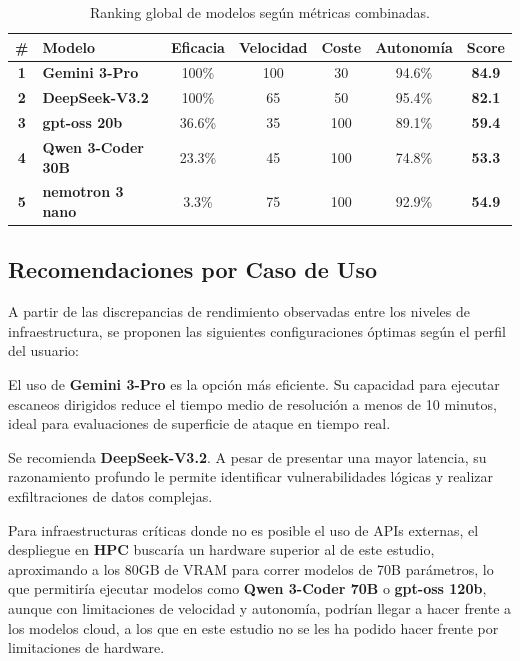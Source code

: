 \begin{table}[H]
\centering
\renewcommand{\arraystretch}{1.3}
\small
\begin{tabular}{|c|l|c|c|c|c|c|}
\hline
\rowcolor[gray]{0.85}
\textbf{\#} & \textbf{Modelo} & \textbf{Eficacia} & \textbf{Velocidad} & \textbf{Coste} & \textbf{Autonomía} & \textbf{Score} \\
\hline
\textbf{1} & \textbf{Gemini 3-Pro} & 100\% & 100 & 30 & 94.6\% & \textbf{84.9} \\
\hline
\textbf{2} & \textbf{DeepSeek-V3.2} & 100\% & 65 & 50 & 95.4\% & \textbf{82.1} \\
\hline
\textbf{3} & \textbf{gpt-oss 20b} & 36.6\% & 35 & 100 & 89.1\% & \textbf{59.4} \\
\hline
\textbf{4} & \textbf{Qwen 3-Coder 30B} & 23.3\% & 45 & 100 & 74.8\% & \textbf{53.3} \\
\hline
\textbf{5} & \textbf{nemotron 3 nano} & 3.3\% & 75 & 100 & 92.9\% & \textbf{54.9} \\
\hline
\end{tabular}
\caption{Ranking global de modelos según métricas combinadas.}
\label{tab:ranking_global}
\end{table}



\subsection{Recomendaciones por Caso de Uso}

A partir de las discrepancias de rendimiento observadas entre los niveles de infraestructura, se proponen las siguientes configuraciones óptimas según el perfil del usuario:

\begin{description}[style=nextline, leftmargin=1.5cm, font=\bfseries]
    \item[Auditorías Rápidas y Triaje Inicial]
    El uso de \textbf{Gemini 3-Pro} es la opción más eficiente. Su capacidad para ejecutar escaneos dirigidos reduce el tiempo medio de resolución a menos de 10 minutos, ideal para evaluaciones de superficie de ataque en tiempo real.
    
    \item[Auditorías Exhaustivas de Aplicaciones Web]
    Se recomienda \textbf{DeepSeek-V3.2}. A pesar de presentar una mayor latencia, su razonamiento profundo le permite identificar vulnerabilidades lógicas y realizar exfiltraciones de datos complejas.
    
    \item[Entornos con Restricciones de Privacidad]
    Para infraestructuras críticas donde no es posible el uso de APIs externas, el despliegue en \textbf{HPC} buscaría un hardware superior al de este estudio, aproximando a los 80GB de VRAM para correr modelos de 70B parámetros, lo que permitiría ejecutar modelos como \textbf{Qwen 3-Coder 70B} o \textbf{gpt-oss 120b}, aunque con limitaciones de velocidad y autonomía, podrían llegar a hacer frente a los modelos cloud, a los que en este estudio no se les ha podido hacer frente por limitaciones de hardware.
\end{description}